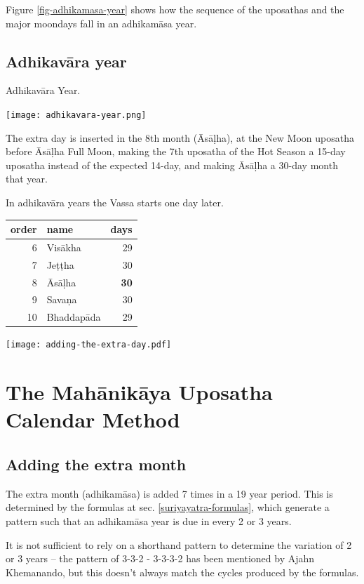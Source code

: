 \documentclass[11pt,oneside]{memoir-article}
\begin{document}
Figure \ref{fig-adhikamasa-year} shows how the sequence of the uposathas and the
major moondays fall in an adhikamāsa year.

\section{Adhikavāra year}
\label{sec-1-4}

\begin{marginfigure}
\caption{\label{fig-adhikavara-year} Adhikavāra Year.}
\texttt{[image: adhikavara-year.png]}
\end{marginfigure}

The extra day is inserted in the 8th month (Āsāḷha), at the New Moon uposatha
before Āsāḷha Full Moon, making the 7th uposatha of the Hot Season a 15-day
uposatha instead of the expected 14-day, and making Āsāḷha a 30-day month that
year.\cite{hasapannyo-zodiac}

In adhikavāra years the Vassa starts one day later.

\begin{center}
\begin{tabular}{rlr}
order & name & days\\
\hline
6 & Visākha & 29\\
7 & Jeṭṭha & 30\\
8 & Āsāḷha & \textbf{30}\\
9 & Savaṇa & 30\\
10 & Bhaddapāda & 29\\
\end{tabular}
\end{center}

\texttt{[image: adding-the-extra-day.pdf]}

\clearpage

\chapter{The Mahānikāya Uposatha Calendar Method}
\label{sec-2}
\section{Adding the extra month}
\label{sec-2-1}

The extra month (adhikamāsa) is added 7 times in a 19 year period. This is
determined by the formulas at sec. \ref{suriyayatra-formulas}, which generate a pattern
such that an adhikamāsa year is due in every 2 or 3 years.

It is not sufficient to rely on a shorthand pattern to determine the variation
of 2 or 3 years -- the pattern of 3-3-2 - 3-3-3-2 has been mentioned by Ajahn
Khemanando\cite{khemanando-adhikamasa}, but this doesn't always match the cycles
produced by the formulas.
\end{document}
